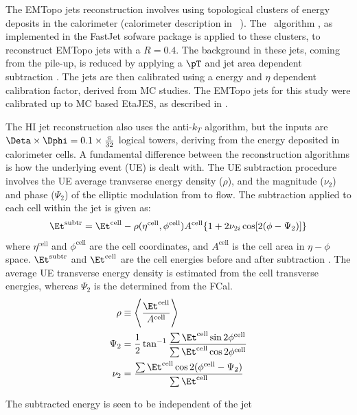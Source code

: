 The EMTopo jets reconstruction involves using topological clusters of energy deposits in the calorimeter (calorimeter description in ~\cite{Aad:2008zzm}). The \antikt\ algorithm \cite{Cacciari:2008gp}, as implemented in the FastJet sofware package \cite{fastjet_algo} is applied to these clusters, to reconstruct EMTopo jets with a $R = 0.4$.  The background in these jets, coming from the pile-up, is reduced by applying a $\pT$ and jet area dependent subtraction \cite{pp_pileup_subtr}. The jets are then calibrated using a energy and $\eta$ dependent calibration factor, derived from MC studies. The EMTopo jets for this study were calibrated up to MC based EtaJES, as described in \cite{CalibReco}.

The HI jet reconstruction also uses the anti-$k_{T}$ algorithm, but the inputs are $\Deta \times \Dphi = 0.1 \times \frac{\pi}{32}$ logical towers, deriving from the energy deposited in calorimeter cells. A fundamental difference between the reconstruction algorithms is how the underlying event (UE) is dealt with. The UE subtraction procedure involves the UE average tranvserse energy density ($\rho$), and the magnitude ($\nu_{2}$) and phase ($\Psi_{2}$) of the elliptic modulation from to flow. The subtraction applied to each cell within the jet is given as: 
\begin{align}
\Et^{\mathrm{subtr}} = \Et^{\mathrm{cell}} - \rho(\eta^{\mathrm{cell}},\phi^{\mathrm{cell}})A^{\mathrm{cell}} \{1 + 2\nu_{2 i}\cos[2(\phi - \Psi_2)]\}
\end{align}
where $\eta^{\mathrm{cell}}$ and $\phi^{\mathrm{cell}}$ are the cell coordinates, and $A^{\mathrm{cell}}$ is the cell area in $\eta-\phi$ space. $\Et^{\mathrm{subtr}}$ and $ \Et^{\mathrm{cell}}$ are the cell energies before and after subtraction \cite{HIjesnote}. The average UE transverse energy density is estimated from the cell transverse energies, whereas $\Psi_2$ is the determined from the FCal.
\begin{align}
\rho &\equiv \left\langle \frac{\Et^{\mathrm{cell}}}{A^{\mathrm{cell}}}\right\rangle \\
\Psi_2 &= \frac{1}{2} \tan^{-1}\frac{\sum \Et^{\mathrm{cell}} \sin 2\phi^{\mathrm{cell}} }{\sum \Et^{\mathrm{cell}} \cos 2\phi^{\mathrm{cell}} } \\
\nu_2 &= \frac{\sum \Et^{\mathrm{cell}} \cos 2(\phi^{\mathrm{cell}} - \Psi_2) }{\sum \Et^{\mathrm{cell}}}
\end{align}

The subtracted energy is seen to be independent of the jet\ \Et \ 

